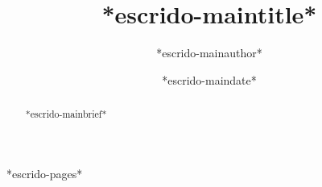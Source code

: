 \documentclass[11pt]{report}
\begin{document}

\title{*escrido-maintitle*}
\author{*escrido-mainauthor*}
\date{*escrido-maindate*}
\maketitle


\begin{abstract}
*escrido-mainbrief*
\end{abstract}


\newpage
\tableofcontents
\newpage


*escrido-pages*
\end{document}
